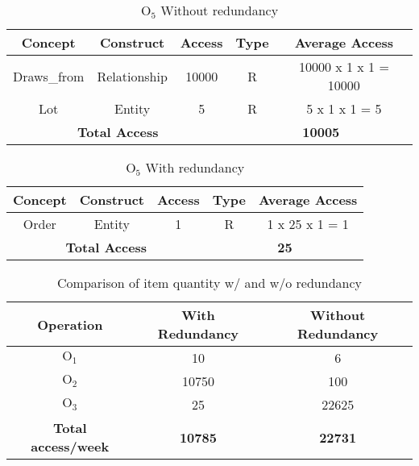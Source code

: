 \begin{table}[!h]\caption{	$ \textrm{O}_\textrm{5} $ Without redundancy }
	\begin{center}
		\begin{tabular}{| c | c | c | c | c |}
			\hline
			\textbf{Concept} & \textbf{Construct} & \textbf{Access} & \textbf{Type} & \textbf{Average Access} \\ \hline
			Draws\_from & Relationship & 10000 & R & 10000 x 1 x 1 = 10000 \\ \hline
			Lot & Entity &  5 & R & 5 x 1 x 1 = 5 \\ \hline
			\multicolumn{3}{|c|}{\textbf{Total Access}} & \multicolumn{2}{|c|}{\textbf{10005}} \\ \hline
		\end{tabular}
	\end{center}
\end{table}
\begin{table}[!h]\caption{	$ \textrm{O}_\textrm{5} $ With redundancy }
	\begin{center}
		\begin{tabular}{| c | c | c | c | c |}
			\hline
			\textbf{Concept} & \textbf{Construct} & \textbf{Access} & \textbf{Type} & \textbf{Average Access} \\ \hline
			Order & Entity & 1 & R & 1 x 25 x 1 = 1 \\ \hline
			\multicolumn{3}{|c|}{\textbf{Total Access}} & \multicolumn{2}{|c|}{\textbf{25}} \\ \hline
		\end{tabular}
	\end{center}
\end{table}
\begin{table}[!h]\caption{ Comparison of item quantity w/ and w/o redundancy }
	\begin{center}
		\begin{tabular}{ | c | c | c | }
			\hline
			\textbf{Operation} & \textbf{With Redundancy} & \textbf{Without Redundancy} \\ \hline
			$ \textrm{O}_\textrm{1} $ & 10 & 6\\ \hline
			$ \textrm{O}_\textrm{2} $ & 10750 & 100 \\ \hline
			$ \textrm{O}_\textrm{3} $ & 25 & 22625 \\\hline
			\textbf{Total access/week } & 	\textbf{10785} &	\textbf{22731} \\\hline
		\end{tabular}
	\end{center}
\end{table}

